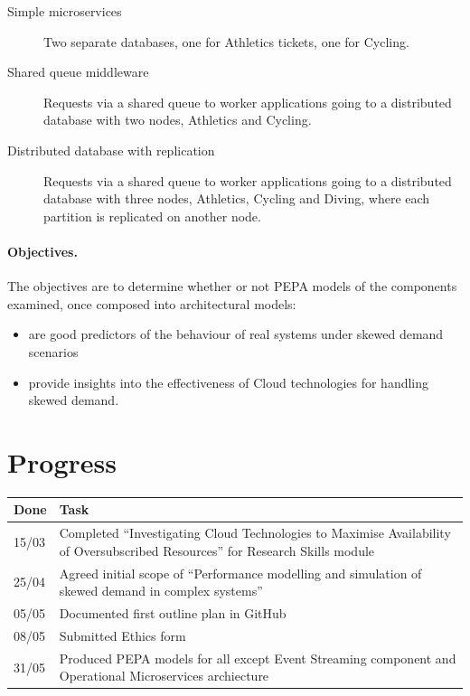 \documentclass{llncs}
\begin{document}
\begin{description}
	\item[Simple microservices] Two separate databases, one for Athletics tickets, one for Cycling.
	\item[Shared queue middleware] Requests via a shared queue to worker applications going to a distributed database with two nodes, Athletics and Cycling.
	\item[Distributed database with replication] Requests via a shared queue to worker applications going to a distributed database with three nodes, Athletics, Cycling and Diving, where each partition is replicated on another node.
\end{description}

\paragraph{Objectives.}  The objectives are to determine whether or not PEPA models of the components examined, once composed into architectural models:
\begin{itemize}
	\item are good predictors of the behaviour of real systems under skewed demand scenarios
	\item provide insights into the effectiveness of Cloud technologies for handling skewed demand.
\end{itemize}

%
%

\section{Progress}

\begin{tabular}{ p{} p{} }
	Done & Task \\
	\hline
	15/03 & Completed ``Investigating Cloud Technologies to Maximise Availability of Oversubscribed Resources'' for Research Skills module \\
	25/04 & Agreed initial scope of ``Performance modelling and simulation of skewed demand in complex systems'' \\
	05/05 & Documented first outline plan in GitHub \\
	08/05 & Submitted Ethics form \\
	31/05 & Produced PEPA models for all except Event Streaming component and Operational Microservices archiecture
\end{tabular}
\end{document}
